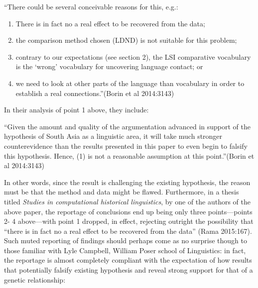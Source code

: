 \begin{myquote}
“There could be several conceivable reasons for this, e.g.:
\end{myquote}

\bgroup

\sizenine

\begin{enumerate}
\itemsep=0pt
\item There is in fact no a real effect to be recovered from the data;

 \item the comparison method chosen (LDND) is not suitable for this problem;

 \item contrary to our expectations (see section 2), the LSI comparative vocabulary is the ‘wrong’ vocabulary for uncovering language contact; or
 
 \item we need to look at other parts of the language than vocabulary in order to establish a real connections.”\hfill (Borin et al 2014:3143)

\end{enumerate}

\egroup

In their analysis of point 1 above, they include:

\begin{myquote}
“Given the amount and quality of the argumentation advanced in support of the hypothesis of South Asia as a linguistic area, it will take much stronger counterevidence than the results presented in this paper to even begin to falsify this hypothesis. Hence, (1) is not a reasonable assumption at this point.”\hfill (Borin et al 2014:3143)
\end{myquote}

In other words, since the result is challenging the existing hypothesis, the reason must be that the method and data might be flawed. Furthermore, in a thesis titled \textit{Studies in computational historical linguistics}, by one of the authors of the above paper, the reportage of conclusions end up being only three points—points 2- 4 above—with point 1 dropped, in effect, rejecting outright the possibility that “there is in fact no a real effect to be recovered from the data” (Rama 2015:167). Such muted reporting of findings should perhaps come as no surprise though to those familiar with Lyle Campbell, William Poser school of Linguistics: in fact, the reportage is almost completely compliant with the expectation of how results that potentially falsify existing hypothesis and reveal strong support for that of a genetic relationship:

